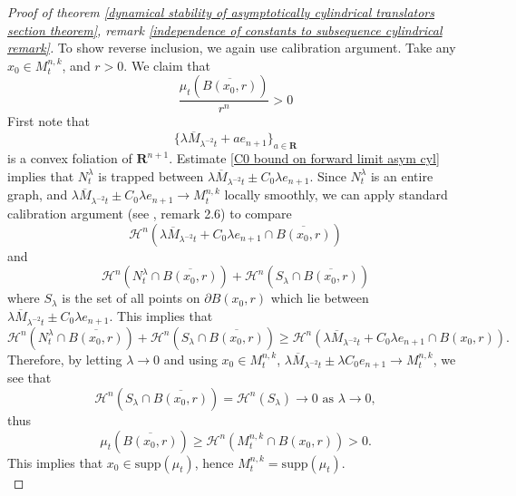 \documentclass[pdflatex,sn-mathphys-num]{sn-jnl}%
\begin{document}
\begin{proof}[Proof of theorem \ref{dynamical stability of asymptotically cylindrical translators section theorem}, remark \ref{independence of constants to subsequence cylindrical remark}]
To show reverse inclusion, we again use calibration argument. Take any $x_0 \in M^{n,k}_t$, and $r > 0$. We claim that 
\begin{equation}
    \frac{\mu_t(\overline{B(x_0,r)})}{r^n} > 0 
\end{equation}
First note that 
\begin{equation}
    \{\lambda\overline{M}_{\lambda^{-2}t} + ae_{n+1}\}_{a \in \mathbf{R}}
\end{equation}
is a convex foliation of $\mathbf{R}^{n+1}$. Estimate \eqref{C0 bound on forward limit asym cyl} implies that $N^{\lambda}_t$ is trapped between $\lambda\overline{M}_{\lambda^{-2}t} \pm C_0\lambda e_{n+1}$. Since $N^{\lambda}_t$ is an entire graph, and $\lambda\overline{M}_{\lambda^{-2}t} \pm C_0\lambda e_{n+1} \to M^{n,k}_t$ locally smoothly, we can apply standard calibration argument (see \cite{Haslhofer2013MeanCF}, remark 2.6) to compare 
\begin{equation}
\mathcal{H}^n(\lambda\overline{M}_{\lambda^{-2}t} + C_0\lambda e_{n+1}\cap \overline{B(x_0,r)})
\end{equation}
and
\begin{equation}
\mathcal{H}^n(N^{\lambda}_t \cap \overline{B(x_0,r)}) + \mathcal{H}^n(S_{\lambda}\cap \overline{B(x_0,r)})
\end{equation}
where $S_{\lambda}$ is the set of all points on $\partial B(x_0, r)$ which lie between $\lambda\overline{M}_{\lambda^{-2}t} \pm C_0\lambda e_{n+1}$. This implies that
\begin{equation}
  \mathcal{H}^n(N^{\lambda}_t \cap \overline{B(x_0,r)}) + \mathcal{H}^n(S_{\lambda}\cap \overline{B(x_0,r)}) \geq \mathcal{H}^n(\lambda\overline{M}_{\lambda^{-2}t} + C_0\lambda e_{n+1}\cap B(x_0,r)).
  \end{equation}
Therefore, by letting $\lambda \to 0$ and using $x_0 \in M^{n,k}_t$, $\lambda\overline{M}_{\lambda^{-2}t} \pm \lambda C_0 e_{n+1}\to M^{n,k}_t$, we see that 
\begin{equation}
    \mathcal{H}^n(S_{\lambda}\cap \overline{B(x_0, r)}) = \mathcal{H}^n(S_{\lambda}) \to 0 \text{ as }\lambda \to 0,
\end{equation}
thus
\begin{equation}\label{area compartison}
    \mu_t(\overline{B(x_0, r)}) \geq \mathcal{H}^n(M^{n,k}_t \cap B(x_0, r)) > 0.
\end{equation}
This implies that $x_0 \in \text{supp}(\mu_t)$, hence $M^{n,k}_t = \text{supp}(\mu_t)$. \\


\end{proof}
\end{document}
